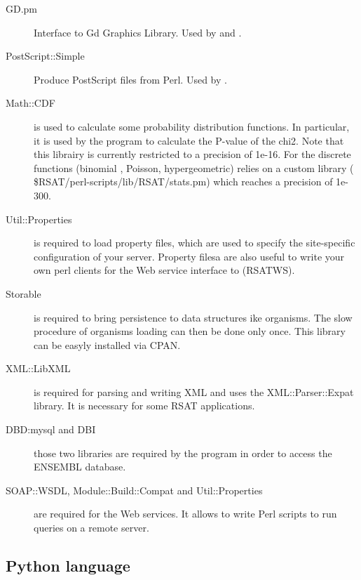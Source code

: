\documentclass{book}
\begin{document}
\begin{description}
\item[GD.pm] Interface to Gd Graphics Library. Used by
   and .

\item[PostScript::Simple] Produce PostScript files from Perl. Used by
  .

\item[Math::CDF] is used to calculate some probability distribution
  functions. In particular, it is used by the program
   to calculate the P-value of the
  chi2. Note that this librairy is currently restricted to a precision
  of 1e-16. For the discrete functions (binomial , Poisson,
  hypergeometric) \RSAT relies on a custom library (
  \$RSAT/perl-scripts/lib/RSAT/stats.pm) which reaches a precision of
  1e-300.

\item[Util::Properties] is required to load property files, which are
  used to specify the site-specific configuration of your \RSAT
  server. Property filesa are also useful to write your own perl
  clients for the Web service interface to \RSAT (RSATWS).

\item[Storable] is required to bring persistence to data structures
  ike organisms. The slow procedure of organisms loading can then be
  done only once. This library can be easyly installed via CPAN.

\item[XML::LibXML] is required for parsing and writing XML and uses
  the XML::Parser::Expat library. It is necessary for some RSAT
  applications.

\item[DBD:mysql and DBI] those two libraries are required by the
  program  in order to access the
  ENSEMBL database.

\item[SOAP::WSDL, Module::Build::Compat and Util::Properties] are
  required for the Web services. It allows to write Perl scripts to
  run \RSAT queries on a remote server.

\end{description}

\subsection{Python language}
\end{document}
